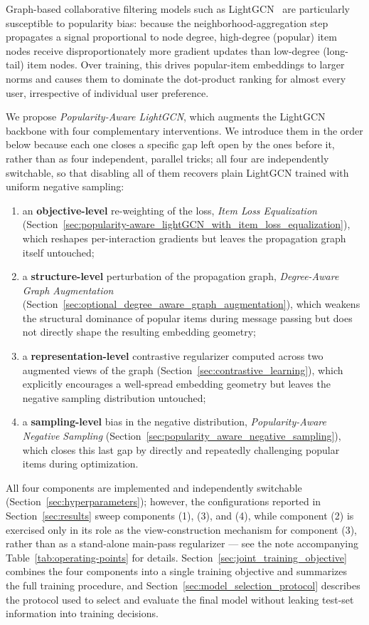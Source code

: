 Graph-based collaborative filtering models such as LightGCN~\cite{he2020lightgcn} are
particularly susceptible to popularity bias: because the neighborhood-aggregation step
propagates a signal proportional to node degree, high-degree (popular) item nodes receive
disproportionately more gradient updates than low-degree (long-tail) item nodes. Over
training, this drives popular-item embeddings to larger norms and causes them to dominate
the dot-product ranking for almost every user, irrespective of individual user preference.

We propose \emph{Popularity-Aware LightGCN}, which augments the LightGCN backbone with four
complementary interventions. We introduce them in the order below because each one closes a
specific gap left open by the ones before it, rather than as four independent, parallel
tricks; all four are independently switchable, so that disabling all of them recovers plain
LightGCN trained with uniform negative sampling:
\begin{enumerate}
    \item[(1)] an \textbf{objective-level} re-weighting of the loss, \emph{Item Loss
    Equalization} (Section~\ref{sec:popularity-aware_lightGCN_with_item_loss_equalization}),
    which reshapes per-interaction gradients but leaves the propagation graph itself
    untouched;
    \item[(2)] a \textbf{structure-level} perturbation of the propagation graph, \emph{Degree-Aware
    Graph Augmentation} (Section~\ref{sec:optional_degree_aware_graph_augmentation}), which
    weakens the structural dominance of popular items during message passing but does not
    directly shape the resulting embedding geometry;
    \item[(3)] a \textbf{representation-level} contrastive regularizer computed across two
    augmented views of the graph (Section~\ref{sec:contrastive_learning}), which explicitly
    encourages a well-spread embedding geometry but leaves the negative sampling distribution
    untouched;
    \item[(4)] a \textbf{sampling-level} bias in the negative distribution, \emph{Popularity-Aware
    Negative Sampling} (Section~\ref{sec:popularity_aware_negative_sampling}), which closes
    this last gap by directly and repeatedly challenging popular items during optimization.
\end{enumerate}
All four components are implemented and independently switchable
(Section~\ref{sec:hyperparameters}); however, the configurations reported in
Section~\ref{sec:results} sweep components (1), (3), and (4), while component (2) is exercised
only in its role as the view-construction mechanism for component (3), rather than as a
stand-alone main-pass regularizer --- see the note accompanying
Table~\ref{tab:operating-points} for details.
Section~\ref{sec:joint_training_objective} combines the four components into a single
training objective and summarizes the full training procedure, and
Section~\ref{sec:model_selection_protocol} describes the protocol used to select and evaluate
the final model without leaking test-set information into training decisions.

